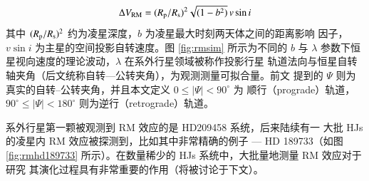 \begin{equation} \label{eq:rvdvofrm}
\Delta V_\mathrm{RM} = (R_\mathrm{p} / R_\mathrm{s})^2 \sqrt{(1-b^2)} \, v\sin i
\end{equation} 
其中 $(R_\mathrm{p} / R_\mathrm{s})^2$ 约为凌星深度，$b$ 为凌星最大时刻两天体之间的距离影响
因子，$v\sin i$ 为主星的空间投影自转速度。图 \ref{fig:rmsim} 所示为不同的 $b$ 与 
$\lambda$ 参数下恒星视向速度的理论波动，$\lambda$ 在系外行星领域被称作投影行星
轨道法向与恒星自转轴夹角（后文统称自转---公转夹角），为观测测量可拟合量。前文
提到的 $\Psi$ 则为真实的自转--公转夹角，并且本文定义 $0 \leq |\Psi | < 90^\circ$ 为
顺行（prograde）轨道，$90^\circ \leq |\Psi | < 180^\circ $ 则为逆行（retrograde）轨道。


系外行星第一颗被观测到 RM 效应的是 HD209458 系统\cite{Queloz2000}，后来陆续有一
大批 HJs 的凌星内 RM 效应被探测到，比如其中非常精确的例子 --- HD 189733（如图 
\ref{fig:rmhd189733}  所示）。在数量稀少的 HJs 系统中，大批量地测量 RM 效应对于研究
其演化过程具有非常重要的作用（将被讨论于下文）。




